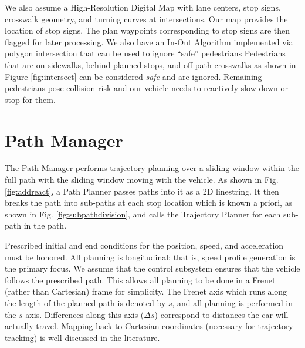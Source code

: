 \documentclass[letterpaper, 10 pt, conference]{ieeeconf}  %
\begin{document}


We also assume a High-Resolution Digital Map with lane centers, stop signs, crosswalk geometry, and turning curves at intersections.
Our map provides the location of stop signs.
The plan waypoints corresponding to stop signs are then flagged for later processing.
We also have an In-Out Algorithm implemented via polygon intersection that can be used to ignore “safe” pedestrians
Pedestrians that are on sidewalks, behind planned stops, and off-path crosswalks as shown in Figure \ref{fig:intersect} can be considered {\it safe} and are ignored.
Remaining pedestrians pose collision risk and our vehicle needs to reactively slow down or stop for them.



\section{Path Manager} \label{sec:pathmanager}


The Path Manager performs trajectory planning over a sliding window within the full path with the sliding window moving with the vehicle.
As shown in Fig. \ref{fig:addreact}, a Path Planner passes paths into it as a 2D linestring.
It then breaks the path into sub-paths at each stop location which is known a priori, as shown in Fig. \ref{fig:subpathdivision}, and calls the Trajectory Planner for each sub-path in the path.

Prescribed initial and end conditions for the position, speed, and acceleration must be honored.
All planning is longitudinal; that is, speed profile generation is the primary focus. We assume that the control subsystem ensures that the vehicle follows the prescribed path.
This allows all planning to be done in a Frenet (rather than Cartesian) frame for simplicity.
The Frenet axis which runs along the length of the planned path is denoted by $s$, and all planning is performed in the $s$-axis.
Differences along this axis ($\Delta s$) correspond to distances the car will actually travel.
Mapping back to Cartesian coordinates (necessary for trajectory tracking) is well-discussed in the literature.
\end{document}
